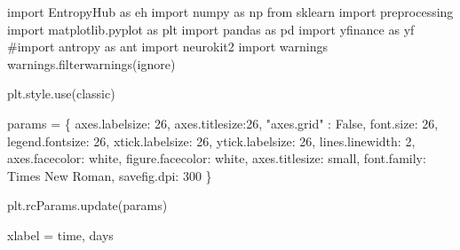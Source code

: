 \documentclass[
  letterpaper,
]{report}
\newenvironment{Shaded}{\begin{snugshade}}{\end{snugshade}}
\newcommand{\CommentTok}[1]{\textcolor[rgb]{0.37,0.37,0.37}{#1}}
\newcommand{\DecValTok}[1]{\textcolor[rgb]{0.68,0.00,0.00}{#1}}
\newcommand{\ImportTok}[1]{\textcolor[rgb]{0.00,0.46,0.62}{#1}}
\newcommand{\NormalTok}[1]{\textcolor[rgb]{0.00,0.23,0.31}{#1}}
\newcommand{\OperatorTok}[1]{\textcolor[rgb]{0.37,0.37,0.37}{#1}}
\newcommand{\StringTok}[1]{\textcolor[rgb]{0.13,0.47,0.30}{#1}}
\newcommand{\VariableTok}[1]{\textcolor[rgb]{0.07,0.07,0.07}{#1}}
\begin{document}
\begin{Shaded}
\begin{Highlighting}[]
\ImportTok{import}\NormalTok{ EntropyHub }\ImportTok{as}\NormalTok{ eh}
\ImportTok{import}\NormalTok{ numpy }\ImportTok{as}\NormalTok{ np}
\ImportTok{from}\NormalTok{ sklearn }\ImportTok{import}\NormalTok{ preprocessing}
\ImportTok{import}\NormalTok{ matplotlib.pyplot }\ImportTok{as}\NormalTok{ plt}
\ImportTok{import}\NormalTok{ pandas }\ImportTok{as}\NormalTok{ pd}
\ImportTok{import}\NormalTok{ yfinance }\ImportTok{as}\NormalTok{ yf}
\CommentTok{\#import antropy as ant}
\ImportTok{import}\NormalTok{ neurokit2}
\ImportTok{import}\NormalTok{ warnings}
\NormalTok{warnings.filterwarnings(}\StringTok{\textquotesingle{}ignore\textquotesingle{}}\NormalTok{)}
\end{Highlighting}
\end{Shaded}

\begin{Shaded}
\begin{Highlighting}[]
\NormalTok{plt.style.use(}\StringTok{\textquotesingle{}classic\textquotesingle{}}\NormalTok{)}

\NormalTok{params }\OperatorTok{=}\NormalTok{ \{}
    \StringTok{\textquotesingle{}axes.labelsize\textquotesingle{}}\NormalTok{: }\DecValTok{26}\NormalTok{,}
    \StringTok{\textquotesingle{}axes.titlesize\textquotesingle{}}\NormalTok{:}\DecValTok{26}\NormalTok{, }
    \StringTok{"axes.grid"}\NormalTok{ : }\VariableTok{False}\NormalTok{,}
    \StringTok{\textquotesingle{}font.size\textquotesingle{}}\NormalTok{: }\DecValTok{26}\NormalTok{, }
    \StringTok{\textquotesingle{}legend.fontsize\textquotesingle{}}\NormalTok{: }\DecValTok{26}\NormalTok{, }
    \StringTok{\textquotesingle{}xtick.labelsize\textquotesingle{}}\NormalTok{: }\DecValTok{26}\NormalTok{, }
    \StringTok{\textquotesingle{}ytick.labelsize\textquotesingle{}}\NormalTok{: }\DecValTok{26}\NormalTok{, }
    \StringTok{\textquotesingle{}lines.linewidth\textquotesingle{}}\NormalTok{: }\DecValTok{2}\NormalTok{,}
    \StringTok{\textquotesingle{}axes.facecolor\textquotesingle{}}\NormalTok{: }\StringTok{\textquotesingle{}white\textquotesingle{}}\NormalTok{,}
    \StringTok{\textquotesingle{}figure.facecolor\textquotesingle{}}\NormalTok{: }\StringTok{\textquotesingle{}white\textquotesingle{}}\NormalTok{,}
    \StringTok{\textquotesingle{}axes.titlesize\textquotesingle{}}\NormalTok{: }\StringTok{\textquotesingle{}small\textquotesingle{}}\NormalTok{,}
    \StringTok{\textquotesingle{}font.family\textquotesingle{}}\NormalTok{: }\StringTok{\textquotesingle{}Times New Roman\textquotesingle{}}\NormalTok{,}
    \StringTok{\textquotesingle{}savefig.dpi\textquotesingle{}}\NormalTok{: }\DecValTok{300}
\NormalTok{\}}

\NormalTok{plt.rcParams.update(params)}

\NormalTok{xlabel }\OperatorTok{=} \StringTok{\textquotesingle{}time, days\textquotesingle{}}
\end{Highlighting}
\end{Shaded}
\end{document}
